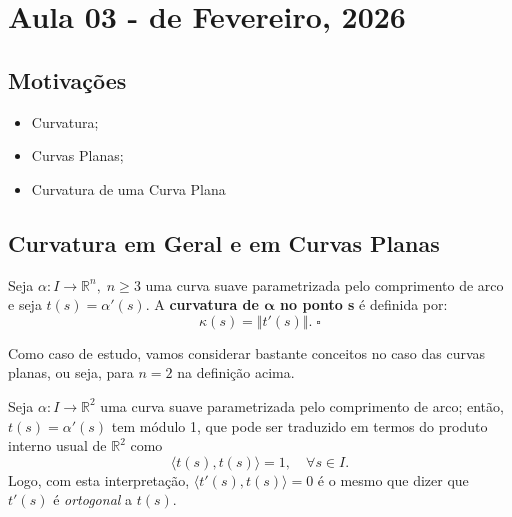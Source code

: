 \documentclass[../differential_geometry.tex]{subfiles}
\begin{document}
\section{Aula 03 - de Fevereiro, 2026}
\subsection{Motivações}
\begin{itemize}
	\item Curvatura;
	\item Curvas Planas;
	\item Curvatura de uma Curva Plana
\end{itemize}
\subsection{Curvatura em Geral e em Curvas Planas}
\begin{def*}
	Seja \(\alpha :I\rightarrow \mathbb{R}^{n},\; n\geq 3\) uma curva suave parametrizada pelo comprimento de arco e seja \(t(s)=\alpha'(s)\). A \textbf{curvatura de \(\mathbf{\alpha} \) no ponto s} é definida por:
	\[
		\kappa (s)=\Vert t'(s) \Vert. \; \square
	\]
\end{def*}
Como caso de estudo, vamos considerar bastante conceitos no caso das curvas planas, ou seja, para \(n=2\) na definição acima.

Seja \(\alpha :I\rightarrow \mathbb{R}^{2}\) uma curva suave parametrizada pelo comprimento de arco; então, \(t(s)=\alpha '(s)\) tem módulo 1, que pode ser traduzido em termos do produto interno usual de \(\mathbb{R}^{2}\) como
\[
	\langle t(s), t(s) \rangle =1, \quad \forall s\in I.
\]
Logo, com esta interpretação, \(\langle t'(s), t(s) \rangle = 0\) é o mesmo que dizer que \(t'(s)\) é \textit{ortogonal} a \(t(s).\)
\end{document}
